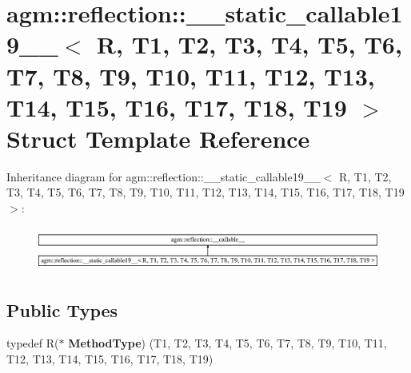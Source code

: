 \hypertarget{structagm_1_1reflection_1_1____static__callable19____}{}\section{agm\+:\+:reflection\+:\+:\+\_\+\+\_\+static\+\_\+callable19\+\_\+\+\_\+$<$ R, T1, T2, T3, T4, T5, T6, T7, T8, T9, T10, T11, T12, T13, T14, T15, T16, T17, T18, T19 $>$ Struct Template Reference}
\label{structagm_1_1reflection_1_1____static__callable19____}
Inheritance diagram for agm\+:\+:reflection\+:\+:\+\_\+\+\_\+static\+\_\+callable19\+\_\+\+\_\+$<$ R, T1, T2, T3, T4, T5, T6, T7, T8, T9, T10, T11, T12, T13, T14, T15, T16, T17, T18, T19 $>$\+:\begin{figure}[H]
\begin{center}
\leavevmode
\includegraphics[height=1.456437cm]{structagm_1_1reflection_1_1____static__callable19____}
\end{center}
\end{figure}
\subsection*{Public Types}
\begin{DoxyCompactItemize}
\item 
typedef R($\ast$ {\bfseries Method\+Type}) (T1, T2, T3, T4, T5, T6, T7, T8, T9, T10, T11, T12, T13, T14, T15, T16, T17, T18, T19)\hypertarget{structagm_1_1reflection_1_1____static__callable19_____a2b06e3b06ec8c7e6d32cc1344f357911}{}\label{structagm_1_1reflection_1_1____static__callable19_____a2b06e3b06ec8c7e6d32cc1344f357911}

\end{DoxyCompactItemize}
